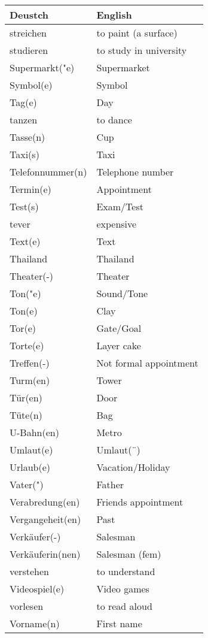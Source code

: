 \documentclass{article}
\renewcommand{\arraystretch}{1}
\begin{document}
\hfill
\begin{minipage}{0.48\textwidth}
    \centering
    \renewcommand{\arraystretch}{1.5}
    \begin{tabular}{|>{\raggedright\arraybackslash}p{3.5cm}|>{\raggedright\arraybackslash}p{3.5cm}|}
        \hline
        \rowcolor{gray!20} \textbf{Deustch} & \textbf{English} \\
        \hline
        streichen & to paint (a surface) \\\hline
        studieren & to study in university \\\hline
        Supermarkt("e) & Supermarket \\\hline
        Symbol(e) & Symbol \\\hline
        Tag(e) & Day \\\hline
        tanzen & to dance \\\hline
        Tasse(n) & Cup \\\hline
        Taxi(s) & Taxi \\\hline
        Telefonnummer(n) & Telephone number \\\hline
        Termin(e) & Appointment \\\hline
        Test(s) & Exam/Test \\\hline
        tever & expensive \\\hline
        Text(e) & Text \\\hline
        Thailand & Thailand \\\hline
        Theater(-) & Theater \\\hline
        Ton("e) & Sound/Tone \\\hline
        Ton(e) & Clay \\\hline
        Tor(e) & Gate/Goal \\\hline
        Torte(e) & Layer cake \\\hline
        Treffen(-) & Not formal appointment \\\hline
        Turm(en) & Tower \\\hline
        Tür(en) & Door \\\hline
        Tüte(n) & Bag \\\hline
        U-Bahn(en) & Metro \\\hline
        Umlaut(e) & Umlaut(¨) \\\hline
        Urlaub(e) & Vacation/Holiday \\\hline
        Vater(") & Father \\\hline
        Verabredung(en) & Friends appointment \\\hline
        Vergangeheit(en) & Past \\\hline
        Verkäufer(-) & Salesman \\\hline
        Verkäuferin(nen) & Salesman (fem) \\\hline
        verstehen & to understand \\\hline
        Videospiel(e) & Video games \\\hline
        vorlesen & to read aloud \\\hline
        Vorname(n) & First name \\\hline
    \end{tabular}
\end{minipage}
\end{document}
